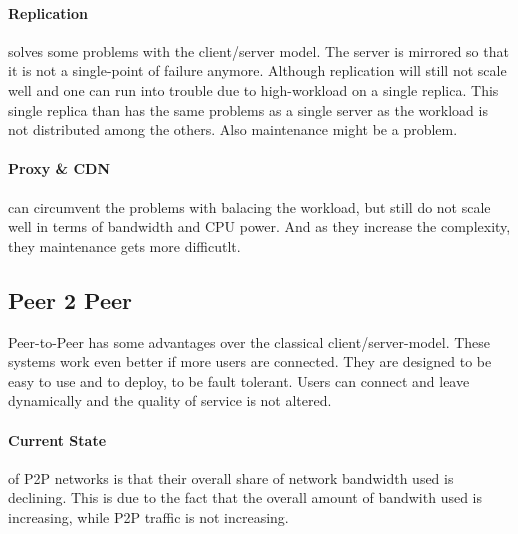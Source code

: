 \paragraph{Replication} %
\label{par:replication}
solves some problems with the client/server model.
The server is mirrored so that it is not a single-point of failure anymore.
Although replication will still not scale well
and one can run into trouble due to high-workload on a single replica.
This single replica than has the same problems as a single server
as the workload is not distributed among the others.
Also maintenance might be a problem.

\paragraph{Proxy \& CDN} %
\label{par:proxy_&_cdn}
can circumvent the problems with balacing the workload,
but still do not scale well in terms of bandwidth and CPU power.
And as they increase the complexity,
they maintenance gets more difficutlt.

\subsection{Peer 2 Peer} %
\label{sub:peer_2_peer}
Peer-to-Peer has some advantages over the classical client/server-model.
These systems work even better if more users are connected.
They are designed to be easy to use and to deploy,
to be fault tolerant.
Users can connect and leave dynamically and the quality of service is not altered.

\paragraph{Current State}
of P2P networks is that their overall share of network bandwidth used is declining.
This is due to the fact that the overall amount of bandwith used is increasing,
while P2P traffic is not increasing.


